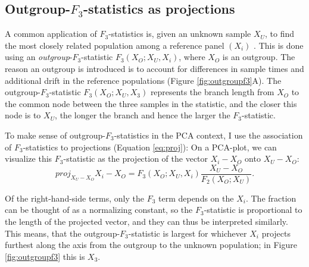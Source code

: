 \documentclass[12pt,fullpage, a4paper]{article}
\newcommand{\vectorproj}[2][]{\textit{proj}_{#1}#2}
\begin{document}
\subsection{Outgroup-$F_3$-statistics as projections}
A common application of $F_3$-statistics is, given an unknown sample $X_U$, to find the most closely related population among a reference panel $(X_i)$ \citep{raghavan2014}. This is done  using an \emph{outgroup}-$F_3$-statistic $F_3(X_O; X_U, X_i)$, where $X_O$ is an outgroup. The reason an outgroup is introduced is to account for differences in sample times and additional drift in the reference populations (Figure \ref{fig:outgroupf3}A). The outgroup-$F_3$-statistic $F_3(X_O; X_U, X_3)$ represents the branch length from $X_O$ to the common node between the three samples in the statistic, and the closer this node is to $X_U$, the longer the branch and hence the larger the $F_3$-statistic. 

To make sense of outgroup-$F_3$-statistics in the PCA context, I use the association of $F_3$-statistics to projections (Equation \ref{eq:proj}):
On a PCA-plot, we can visualize this $F_3$-statistic as the projection of the vector $X_i - X_O$ onto $X_U - X_O$: 
$$\vectorproj[X_U - X_O]{X_i - X_O} =F_3(X_O; X_U, X_i) \frac{X_U - X_O}{F_2(X_O; X_U)}.$$

Of the right-hand-side terms, only the $F_3$ term depends on the $X_i$. The fraction can be thought of as a normalizing constant,  so the $F_3$-statistic is proportional to the length of  the projected vector, and they can thus be interpreted similarly. This means, that the outgroup-$F_3$-statistic is largest for whichever $X_i$ projects furthest along the axis from the outgroup to the unknown population; in Figure \ref{fig:outgroupf3} this is $X_3$.
\end{document}
